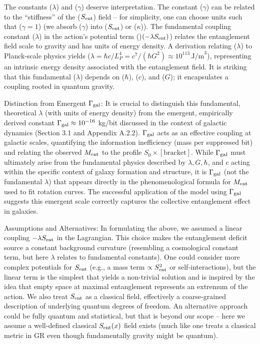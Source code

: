 \documentclass[11pt]{article}
\begin{document}
The constants ($\lambda$) and ($\gamma$) deserve interpretation. The constant ($\gamma$) can be related to the “stiffness” of the ($S_{\rm ent}$) field – for simplicity, one can choose units such that ($\gamma=1$) (we absorb ($\gamma$) into ($S_{\rm ent}$) or ($\kappa$)). The fundamental coupling constant ($\lambda$) in the action's potential term ()$(-\lambda S_{\rm ent})$) relates the entanglement field scale to gravity and has units of energy density. A derivation relating ($\lambda$) to Planck-scale physics yields ($\lambda = \hbar c / L_P^4 = c^7 / (\hbar G^2) \approx 10^{113}\,\text{J/m}^3$), representing an intrinsic energy density associated with the entanglement field. It is striking that this fundamental ($\lambda$) depends on ($\hbar$), ($c$), and ($G$); it encapsulates a coupling rooted in quantum gravity.

Distinction from Emergent $\Gamma_{\rm gal}$: It is crucial to distinguish this fundamental, theoretical $\lambda$ (with units of energy density) from the emergent, empirically derived constant $\Gamma_{\rm gal} \approx 10^{-16}$ kg/bit discussed in the context of galactic dynamics (Section 3.1 and Appendix A.2.2). $\Gamma_{\rm gal}$ acts as an effective coupling at galactic scales, quantifying the information inefficiency (mass per suppressed bit) and relating the observed $M_{\rm ent}$ to the profile $S_0 \times [\text{bracket}]$. While $\Gamma_{\rm gal}$ must ultimately arise from the fundamental physics described by $\lambda, G, \hbar$, and c acting within the specific context of galaxy formation and structure, it is $\Gamma_{\rm gal}$ (not the fundamental $\lambda$) that appears directly in the phenomenological formula for $M_{\rm ent}$ used to fit rotation curves. The successful application of the model using $\Gamma_{\rm gal}$ suggests this emergent scale correctly captures the collective entanglement effect in galaxies.

Assumptions and Alternatives: In formulating the above, we assumed a linear coupling $-\lambda S_{\rm ent}$ in the Lagrangian. This choice makes the entanglement deficit source a constant background curvature (resembling a cosmological constant term, but here $\lambda$ relates to fundamental constants). One could consider more complex potentials for $S_{\rm ent}$ (e.g., a mass term $\propto S_{\rm ent}^2$ or self-interactions), but the linear term is the simplest that yields a non-trivial solution and is inspired by the idea that empty space at maximal entanglement represents an extremum of the action. We also treat $S_{\rm ent}$ as a classical field, effectively a coarse-grained description of underlying quantum degrees of freedom. An alternative approach could be fully quantum and statistical, but that is beyond our scope – here we assume a well-defined classical $S_{\rm ent}(x)$ field exists (much like one treats a classical metric in GR even though fundamentally gravity might be quantum).  
\end{document}
